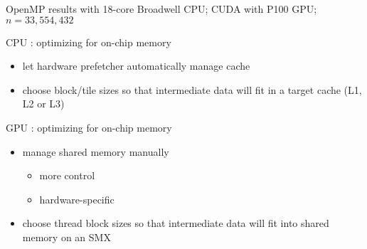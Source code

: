 \documentclass[aspectratio=43]{beamer}
\begin{document}
\begin{frame}[fragile]{}
\begin{columns}[T]
\begin{column}{0.5\textwidth}
        \end{column}
    \end{columns}
    {\footnotesize OpenMP results with 18-core Broadwell CPU; CUDA with P100 GPU; $n=33,554,432$}
\end{frame}

\begin{frame}[fragile]{}
    \begin{info}{CPU : optimizing for on-chip memory}
        \begin{itemize}
            \item let hardware prefetcher automatically manage cache
            \item choose block/tile sizes so that intermediate data will fit in a target cache (L1, L2 or L3)
        \end{itemize}
    \end{info}
    \begin{info}{GPU : optimizing for on-chip memory}
        \begin{itemize}
            \item manage shared memory manually
            \begin{itemize}
                \item more control
                \item hardware-specific
            \end{itemize}
            \item choose thread block sizes so that intermediate data will fit into shared memory on an SMX
        \end{itemize}
    \end{info}

\end{frame}
\end{document}
